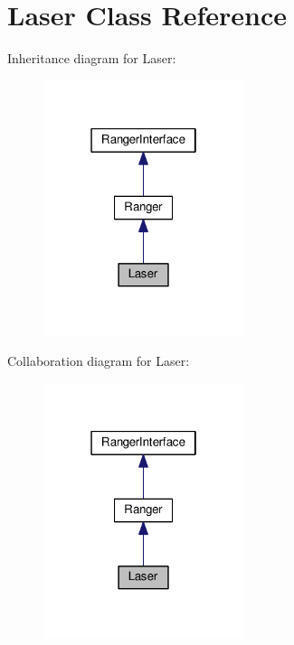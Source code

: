 \hypertarget{classLaser}{}\section{Laser Class Reference}
\label{classLaser}


Inheritance diagram for Laser\+:
\nopagebreak
\begin{figure}[H]
\begin{center}
\leavevmode
\includegraphics[width=166pt]{classLaser__inherit__graph}
\end{center}
\end{figure}


Collaboration diagram for Laser\+:
\nopagebreak
\begin{figure}[H]
\begin{center}
\leavevmode
\includegraphics[width=166pt]{classLaser__coll__graph}
\end{center}
\end{figure}
